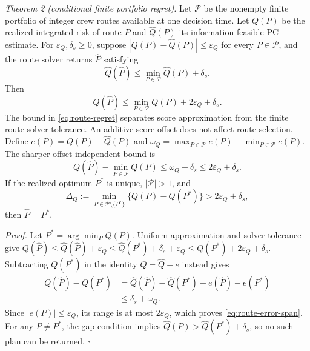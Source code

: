 \documentclass[journal]{IEEEtran}
\begin{document}
\textit{Theorem 2 (conditional finite portfolio regret).}  Let $\mathcal P$ be the nonempty finite
portfolio of integer crew routes available at one decision time.  Let $Q(P)$
be the realized integrated risk of route $P$ and $\widehat Q(P)$ its
information feasible PC estimate.  For $\varepsilon_Q,\delta_s\ge0$, suppose
$|Q(P)-\widehat Q(P)|\le\varepsilon_Q$ for every $P\in\mathcal P$, and the
route solver returns $\widehat P$ satisfying
\begin{equation}
\widehat Q(\widehat P)\le\min_{P\in\mathcal P}\widehat Q(P)+\delta_s.
\end{equation}
Then
\begin{equation}
Q(\widehat P)\le\min_{P\in\mathcal P}Q(P)+2\varepsilon_Q+\delta_s.
\label{eq:route-regret}
\end{equation}
The bound in \eqref{eq:route-regret} separates score approximation from the
finite route solver tolerance.
An additive score offset does not affect route selection.  Define
$e(P)=Q(P)-\widehat Q(P)$ and
$\omega_Q=\max_{P\in\mathcal P}e(P)-\min_{P\in\mathcal P}e(P)$.
The sharper offset independent bound is
\begin{equation}
Q(\widehat P)-\min_{P\in\mathcal P}Q(P)\le\omega_Q+\delta_s
\le 2\varepsilon_Q+\delta_s.
\label{eq:route-error-span}
\end{equation}
If the realized optimum $P^*$ is unique, $|\mathcal P|>1$, and
\begin{equation}
\Delta_Q:=\min_{P\in\mathcal P\setminus\{P^*\}}
\{Q(P)-Q(P^*)\}>2\varepsilon_Q+\delta_s,
\end{equation}
then $\widehat P=P^*$.

\textit{Proof.}  Let $P^*=\arg\min_P Q(P)$.  Uniform approximation and solver
tolerance give
$Q(\widehat P)\le\widehat Q(\widehat P)+\varepsilon_Q
\le\widehat Q(P^*)+\delta_s+\varepsilon_Q
\le Q(P^*)+2\varepsilon_Q+\delta_s$.
Subtracting $Q(P^*)$ in the identity $Q=\widehat Q+e$ instead gives
\begin{align}
Q(\widehat P)-Q(P^*)
&=\widehat Q(\widehat P)-\widehat Q(P^*)
+e(\widehat P)-e(P^*) \nonumber\\
&\le\delta_s+\omega_Q.
\end{align}
Since $|e(P)|\le\varepsilon_Q$, its range is at most $2\varepsilon_Q$,
which proves \eqref{eq:route-error-span}.
For any $P\ne P^*$, the gap condition implies
$\widehat Q(P)>\widehat Q(P^*)+\delta_s$, so no such plan can be returned.
\hfill $\square$


\end{document}
